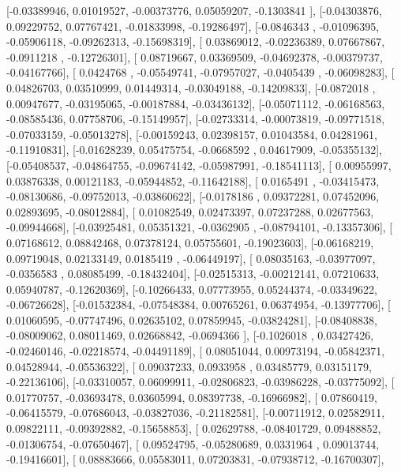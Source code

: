 \documentclass{article}
\begin{document}
       [-0.03389946,  0.01019527, -0.00373776,  0.05059207, -0.1303841 ],
       [-0.04303876,  0.09229752,  0.07767421, -0.01833998, -0.19286497],
       [-0.0846343 , -0.01096395, -0.05906118, -0.09262313, -0.15698319],
       [ 0.03869012, -0.02236389,  0.07667867, -0.0911218 , -0.12726301],
       [ 0.08719667,  0.03369509, -0.04692378, -0.00379737, -0.04167766],
       [ 0.0424768 , -0.05549741, -0.07957027, -0.0405439 , -0.06098283],
       [ 0.04826703,  0.03510999,  0.01449314, -0.03049188, -0.14209833],
       [-0.0872018 ,  0.00947677, -0.03195065, -0.00187884, -0.03436132],
       [-0.05071112, -0.06168563, -0.08585436,  0.07758706, -0.15149957],
       [-0.02733314, -0.00073819, -0.09771518, -0.07033159, -0.05013278],
       [-0.00159243,  0.02398157,  0.01043584,  0.04281961, -0.11910831],
       [-0.01628239,  0.05475754, -0.0668592 ,  0.04617909, -0.05355132],
       [-0.05408537, -0.04864755, -0.09674142, -0.05987991, -0.18541113],
       [ 0.00955997,  0.03876338,  0.00121183, -0.05944852, -0.11642188],
       [ 0.0165491 , -0.03415473, -0.08130686, -0.09752013, -0.03860622],
       [-0.0178186 ,  0.09372281,  0.07452096,  0.02893695, -0.08012884],
       [ 0.01082549,  0.02473397,  0.07237288,  0.02677563, -0.09944668],
       [-0.03925481,  0.05351321, -0.0362905 , -0.08794101, -0.13357306],
       [ 0.07168612,  0.08842468,  0.07378124,  0.05755601, -0.19023603],
       [-0.06168219,  0.09719048,  0.02133149,  0.0185419 , -0.06449197],
       [ 0.08035163, -0.03977097, -0.0356583 ,  0.08085499, -0.18432404],
       [-0.02515313, -0.00212141,  0.07210633,  0.05940787, -0.12620369],
       [-0.10266433,  0.07773955,  0.05244374, -0.03349622, -0.06726628],
       [-0.01532384, -0.07548384,  0.00765261,  0.06374954, -0.13977706],
       [ 0.01060595, -0.07747496,  0.02635102,  0.07859945, -0.03824281],
       [-0.08408838, -0.08009062,  0.08011469,  0.02668842, -0.0694366 ],
       [-0.1026018 ,  0.03427426, -0.02460146, -0.02218574, -0.04491189],
       [ 0.08051044,  0.00973194, -0.05842371,  0.04528944, -0.05536322],
       [ 0.09037233,  0.0933958 ,  0.03485779,  0.03151179, -0.22136106],
       [-0.03310057,  0.06099911, -0.02806823, -0.03986228, -0.03775092],
       [ 0.01770757, -0.03693478,  0.03605994,  0.08397738, -0.16966982],
       [ 0.07860419, -0.06415579, -0.07686043, -0.03827036, -0.21182581],
       [-0.00711912,  0.02582911,  0.09822111, -0.09392882, -0.15658853],
       [ 0.02629788, -0.08401729,  0.09488852, -0.01306754, -0.07650467],
       [ 0.09524795, -0.05280689,  0.0331964 ,  0.09013744, -0.19416601],
       [ 0.08883666,  0.05583011,  0.07203831, -0.07938712, -0.16700307],
\end{document}
